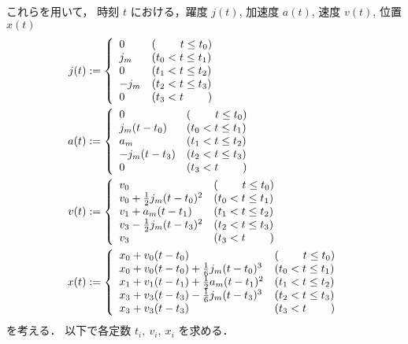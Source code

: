 \documentclass[a5paper]{ltjsarticle}
\begin{document}
これらを用いて，
時刻 $t$ における，躍度 $j(t)$, 加速度 $a(t)$, 速度 $v(t)$, 位置 $x(t)$
\begin{align}
    j(t)
     & :=
    \left\{ \begin{array}{ll}
        0    & (\hspace{2.2em}t \le t_0) \\
        j_m  & (t_0 < t \le t_1)         \\
        0    & (t_1 < t \le t_2)         \\
        -j_m & (t_2 < t \le t_3)         \\
        0    & (t_3 < t \hspace{2.2em})
    \end{array} \right.
    \\
    a(t)
     & :=
    \left\{ \begin{array}{ll}
        0           & (\hspace{2.2em}t \le t_0) \\
        j_m(t-t_0)  & (t_0 < t \le t_1)         \\
        a_m         & (t_1 < t \le t_2)         \\
        -j_m(t-t_3) & (t_2 < t \le t_3)         \\
        0           & (t_3 < t \hspace{2.2em})
    \end{array} \right.
    \\
    v(t)
     & :=
    \left\{ \begin{array}{ll}
        v_0                           & (\hspace{2.2em} t \le t_0) \\
        v_0 + \frac{1}{2}j_m(t-t_0)^2 & (t_0 < t \le t_1)          \\
        v_1 + a_m(t-t_1)              & (t_1 < t \le t_2)          \\
        v_3 - \frac{1}{2}j_m(t-t_3)^2 & (t_2 < t \le t_3)          \\
        v_3                           & (t_3 < t \hspace{2.2em})
    \end{array} \right.
    \\
    x(t)
     & :=
    \left\{ \begin{array}{ll}
        x_0 + v_0(t-t_0)                           & (\hspace{2.2em} t \le t_0) \\
        x_0 + v_0(t-t_0) + \frac{1}{6}j_m(t-t_0)^3 & (t_0 < t \le t_1)          \\
        x_1 + v_1(t-t_1) + \frac{1}{2}a_m(t-t_1)^2 & (t_1 < t \le t_2)          \\
        x_3 + v_3(t-t_3) - \frac{1}{6}j_m(t-t_3)^3 & (t_2 < t \le t_3)          \\
        x_3 + v_3(t-t_3)                           & (t_3 < t \hspace{2.2em})
    \end{array} \right.
\end{align}
を考える．
以下で各定数 $t_i,~ v_i,~ x_i$ を求める．
\end{document}
